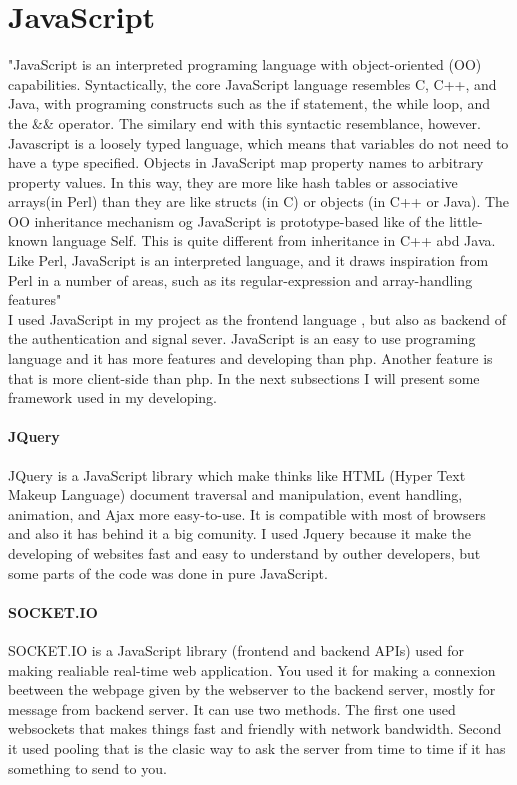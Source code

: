 \section{JavaScript}
\label{sec:javascript}
"JavaScript is an interpreted programing language with object-oriented (OO)
capabilities. Syntactically, the core JavaScript language resembles C, C++,
and Java, with programing constructs such as the if statement, the while loop,
and the \&\& operator. The similary end with this syntactic resemblance, however.
Javascript is a loosely typed language, which means that variables do not need
to have a type specified. Objects in JavaScript map property names to arbitrary property
values. In this way, they are more like hash tables or associative arrays(in Perl) than
they are like structs (in C) or objects (in C++ or Java). The OO inheritance mechanism
og JavaScript is prototype-based like of the little-known language Self. This is quite
different from inheritance in C++ abd Java. Like Perl, JavaScript is an interpreted
language, and it draws inspiration from Perl in a number of areas, such as its regular-expression
and array-handling features" \cite{flanagan2006javascript} \\
I used JavaScript in my project as the frontend language , but also as backend of the authentication and
signal sever. JavaScript is an easy to use programing language and it has more features and developing
than php. Another feature is that is more client-side than php. In the next subsections I will present
some framework used in my developing.


\paragraph{JQuery}
JQuery is a JavaScript library which make thinks like HTML (Hyper Text Makeup Language)
document traversal and manipulation, event handling, animation, and Ajax more easy-to-use.
It is compatible with most of browsers and also it has behind it a big comunity. I used
Jquery because it make the developing of websites fast and easy to understand by outher
developers, but some parts of the code was done in pure JavaScript.


\paragraph{SOCKET.IO}
SOCKET.IO is a JavaScript library (frontend and backend APIs) used for making
realiable real-time web application. You used it for making a connexion beetween
the webpage given by the webserver to the backend server, mostly for message from
backend server. It can use two methods. The first one used websockets that makes
things fast and friendly with network bandwidth. Second it used pooling that is the
clasic way to ask the server from time to time if it has something to send to you.

